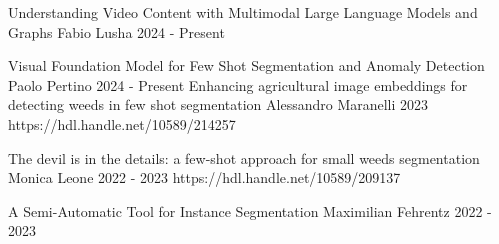 



\begin{cvhonors}
  \msctesi
    {Understanding Video Content with Multimodal Large Language Models and Graphs}
    {Fabio Lusha} %
    {} %
    {2024 - Present} %
    {}

  \msctesi
    {Visual Foundation Model for Few Shot Segmentation and Anomaly Detection}
    {Paolo Pertino} %
    {} %
    {2024 - Present} %
    {}
  \msctesi
    {Enhancing agricultural image embeddings for detecting weeds in few shot segmentation}
    {Alessandro Maranelli} %
    {} %
    {2023} %
    {https://hdl.handle.net/10589/214257}

  \msctesi
    {The devil is in the details: a few-shot approach for small weeds segmentation}
    {Monica Leone} %
    {} %
    {2022 - 2023} %
    {https://hdl.handle.net/10589/209137} %

  \msctesi
    {A Semi-Automatic Tool for Instance Segmentation}
    {Maximilian Fehrentz} %
    {}%
    {2022 - 2023} 
    {}
\end{cvhonors}
